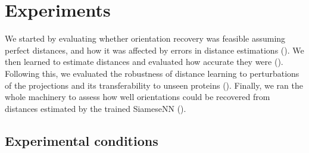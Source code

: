 \section{Experiments}\label{sec:experiments}


We started by evaluating whether orientation recovery  was feasible assuming perfect distances, and how it was affected by errors in distance estimations ().
We then learned to estimate distances  and evaluated how accurate they were ().
Following this, we evaluated the robustness of distance learning to perturbations of the projections and its transferability to unseen proteins ().
Finally, we ran the whole machinery to assess how well orientations could be recovered from distances estimated by the trained SiameseNN ().


\subsection{Experimental conditions}\label{sec:results:data}

